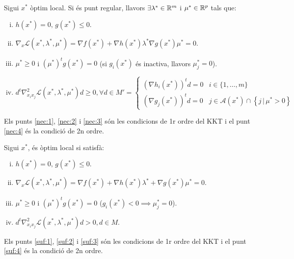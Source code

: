 \begin{prop}
    Sigui $x^*$ \`optim local. Si \'es punt regular, llavors $\exists \lambda^* \in \mathbb{R}^m$ i $\mu^* \in \mathbb{R}^p$ tals que:
    \begin{enumerate}[i)]
        \item \label{nec:1} $h\left( x^* \right) = 0,\, g\left( x^* \right) \leq 0$.
        \item \label{nec:2} $\nabla_x \mathcal{L}\left( x^*, \lambda^*, \mu^* \right) = \nabla f\left( x^* \right) + \nabla h\left( x^* \right) \lambda^* \nabla g\left( x^* \right)\mu^* = 0$.
        \item \label{nec:3} $\mu^* \geq 0$ i $\left( \mu^* \right)^t g\left( x^* \right) = 0$ (si $g_i\left( x^* \right)$ \'es inactiva, llavors $\mu_j^* = 0$).
        \item \label{nec:4} $d^t \nabla_{x_ix_j}^2 \mathcal{L} \left( x^*, \lambda^*, \mu^* \right) d \geq 0, \forall d\in M' =
            \begin{cases}
                \left( \nabla h_i\left( x^* \right) \right)^t d = 0 & i \in \{1,\dots,m\} \\
                \left( \nabla g_j\left( x^* \right) \right)^t d = 0 & j \in \mathcal{A}\left( x^* \right) \cap \left\{ j \,|\, \mu^* > 0 \right\}
            \end{cases}$ \\
    \end{enumerate}
    Els punts \ref{nec:1}, \ref{nec:2} i \ref{nec:3} s\'on les condicions de 1r ordre del KKT i el punt \ref{nec:4} \'es la condici\'o de 2n ordre.
\end{prop}
\begin{prop}
    Sigui $x^*$, \'es \`optim local si satisf\`a:
    \begin{enumerate}[i)]
        \item \label{suf:1} $h\left( x^* \right) = 0,\, g\left( x^* \right) \leq 0$.
        \item \label{suf:2} $\nabla_x \mathcal{L} \left( x^*, \lambda^*, \mu^* \right) = \nabla f\left( x^* \right) + \nabla h\left( x^* \right)\lambda^* + \nabla g\left( x^* \right)\mu^* = 0$.
        \item \label{suf:3} $\mu^* \geq 0$ i $\left( \mu^* \right)^t g\left( x^* \right) = 0$ ($g_i\left( x^* \right) < 0 \implies \mu_j^* = 0$).
        \item \label{suf:4} $d^t \nabla_{x_ix_j}^2 \mathcal{L}\left( x^*, \lambda^*, \mu^* \right) d > 0, d \in M$.
    \end{enumerate}
    Els punts \ref{suf:1}, \ref{suf:2} i \ref{suf:3} s\'on les condicions de 1r ordre del KKT i el punt \ref{suf:4} \'es la condici\'o de 2n ordre.
\end{prop}
